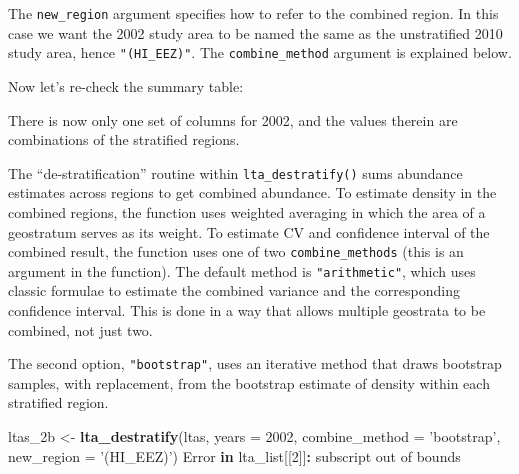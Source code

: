 \documentclass[
]{book}
\newenvironment{Shaded}{\begin{snugshade}}{\end{snugshade}}
\newcommand{\ControlFlowTok}[1]{\textcolor[rgb]{0.13,0.29,0.53}{\textbf{#1}}}
\newcommand{\DataTypeTok}[1]{\textcolor[rgb]{0.13,0.29,0.53}{#1}}
\newcommand{\DecValTok}[1]{\textcolor[rgb]{0.00,0.00,0.81}{#1}}
\newcommand{\KeywordTok}[1]{\textcolor[rgb]{0.13,0.29,0.53}{\textbf{#1}}}
\newcommand{\NormalTok}[1]{#1}
\newcommand{\OperatorTok}[1]{\textcolor[rgb]{0.81,0.36,0.00}{\textbf{#1}}}
\newcommand{\OtherTok}[1]{\textcolor[rgb]{0.56,0.35,0.01}{#1}}
\newcommand{\StringTok}[1]{\textcolor[rgb]{0.31,0.60,0.02}{#1}}
\begin{document}
The \texttt{new\_region} argument specifies how to refer to the combined region. In this case we want the 2002 study area to be named the same as the unstratified 2010 study area, hence \texttt{"(HI\_EEZ)"}. The \texttt{combine\_method} argument is explained below.

Now let's re-check the summary table:

\begin{Shaded}
\end{Shaded}

There is now only one set of columns for 2002, and the values therein are combinations of the stratified regions.

The ``de-stratification'' routine within \texttt{lta\_destratify()} sums abundance estimates across regions to get combined abundance. To estimate density in the combined regions, the function uses weighted averaging in which the area of a geostratum serves as its weight. To estimate CV and confidence interval of the combined result, the function uses one of two \texttt{combine\_methods} (this is an argument in the function). The default method is \texttt{"arithmetic"}, which uses classic formulae to estimate the combined variance and the corresponding confidence interval. This is done in a way that allows multiple geostrata to be combined, not just two.

The second option, \texttt{"bootstrap"}, uses an iterative method that draws bootstrap samples, with replacement, from the bootstrap estimate of density within each stratified region.

\begin{Shaded}
\begin{Highlighting}[]
\NormalTok{ltas_2b <-}
\StringTok{  }\KeywordTok{lta_destratify}\NormalTok{(ltas,}
               \DataTypeTok{years =} \DecValTok{2002}\NormalTok{,}
               \DataTypeTok{combine_method =} \StringTok{'bootstrap'}\NormalTok{,}
               \DataTypeTok{new_region =} \StringTok{'(HI_EEZ)'}\NormalTok{)}
\NormalTok{Error }\ControlFlowTok{in}\NormalTok{ lta_list[[}\DecValTok{2}\NormalTok{]]}\OperatorTok{:}\StringTok{ }\NormalTok{subscript out of bounds}
\end{Highlighting}
\end{Shaded}
\end{document}
